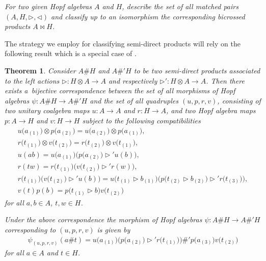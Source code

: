 \documentclass[10pt,a4paper]{amsart}
\numberwithin{equation}{section}
\newtheorem{Theorem}{Theorem}[section]
\begin{document}
\textit{For two given Hopf algebras $A$ and $H$, describe the set of all matched pairs $(A, H, \triangleright, \triangleleft)$ and classify
up to an isomorphism the corresponding bicrossed products $A \bowtie H$.}

The strategy we employ for classifying semi-direct products will rely on the following result which is a special case of \cite[Corollary~3.3]{abm}.

\begin{Theorem}\label{toatemorf}
Consider $A \# H$ and $A \#' H$ to be two semi-direct products associated to the left actions $\triangleright \colon H\otimes A \to A$ and
respectively $\triangleright' \colon H\otimes A \to A$. Then there exists a~bijective correspondence between the set of all morphisms of Hopf
algebras $\psi \colon A \# H \to A \# ' H $ and the set of all quadruples $(u, p, r, v)$, consisting of two unitary coalgebra maps $u\colon A \to A$ and $r\colon H \rightarrow A$, and two Hopf algebra maps $p\colon A \to H$ and $v\colon H \rightarrow H$ subject to the following compatibilities
\begin{gather}
u\big(a_{(1)}\big) \otimes p\big(a_{(2)}\big) = u\big(a_{(2)}\big) \otimes p\big(a_{(1)}\big),\label{C1}\\
r\big(t_{(1)}\big) \otimes v\big(t_{(2)}\big) = r\big(t_{(2)}\big) \otimes v\big(t_{(1)}\big),\label{C2}\\
u(ab) = u\big(a_{(1)}\big) \big( p \big(a_{(2)}\big) \triangleright' u(b) \big),\label{C3}\\
r(tw) = r\big(t_{(1)}\big) \big(v\big(t_{(2)}\big) \triangleright' r(w)\big),\label{C4}\\
r\big(t_{(1)}\big) \big(v\big(t_{(2)}\big) \triangleright' u(b) \big) = u \big(t_{(1)} \triangleright b_{(1)}\big) \big( p \big(t_{(2)}
\triangleright b_{(2)}\big) \triangleright' r\big(t_{(3)}\big) \big) ,\label{C5}\\
v(t) p (b)= p \big(t_{(1)} \triangleright b\big) v \big(t_{(2)}\big)\label{C6}
\end{gather}
for all $a, b \in A$, $t, w \in H$.

Under the above correspondence the morphism of Hopf algebras $\psi\colon A \# H \to A \# ' H $ corresponding to $(u, p, r, v)$ is given by
\begin{gather*}%
\psi_{(u, p,r, v)}(a \# t) = u\big(a_{(1)}\big) \big( p\big(a_{(2)}\big) \triangleright' r\big(t_{(1)}\big) \big) \#' p\big(a_{(3)}\big) v\big(t_{(2)}\big)
\end{gather*}
for all $a \in A$ and $t\in H$.
\end{Theorem}
\end{document}
